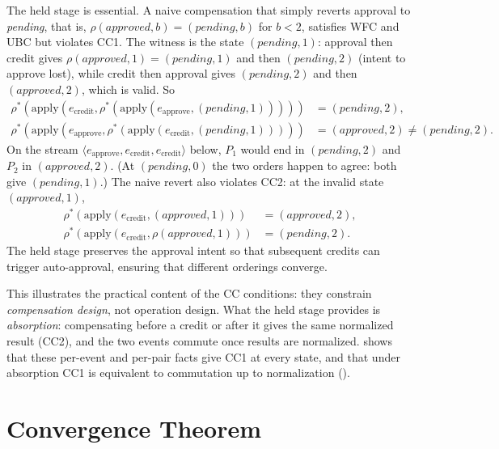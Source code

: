 \documentclass[11pt,a4paper]{article}
\theoremstyle{plain}
\theoremstyle{definition}
\theoremstyle{remark}
\renewcommand{\_}{\textunderscore\allowbreak}
\begin{document}
The held stage is essential.  A naive compensation that simply reverts
approval to \textit{pending}, that is,
$\rho(\textit{approved}, b) = (\textit{pending}, b)$ for $b < 2$, satisfies WFC
and UBC but violates CC1.  The witness is the state $(\textit{pending}, 1)$:
approval then credit gives $\rho(\textit{approved}, 1) = (\textit{pending}, 1)$
and then $(\textit{pending}, 2)$ (intent to approve lost), while credit then
approval gives $(\textit{pending}, 2)$ and then $(\textit{approved}, 2)$, which
is valid.  So
\begin{align*}
\rho^*(\mathrm{apply}(e_{\mathrm{credit}},
  \rho^*(\mathrm{apply}(e_{\mathrm{approve}}, (\textit{pending}, 1)))))
&= (\textit{pending}, 2), \\
\rho^*(\mathrm{apply}(e_{\mathrm{approve}},
  \rho^*(\mathrm{apply}(e_{\mathrm{credit}}, (\textit{pending}, 1)))))
&= (\textit{approved}, 2) \neq (\textit{pending}, 2).
\end{align*}
On the stream $\langle e_{\mathrm{approve}}, e_{\mathrm{credit}},
e_{\mathrm{credit}} \rangle$ below, $P_1$ would end in $(\textit{pending}, 2)$
and $P_2$ in $(\textit{approved}, 2)$.  (At $(\textit{pending}, 0)$ the two
orders happen to agree: both give $(\textit{pending}, 1)$.)  The naive revert
also violates CC2: at the invalid state $(\textit{approved}, 1)$,
\begin{align*}
\rho^*(\mathrm{apply}(e_{\mathrm{credit}}, (\textit{approved}, 1)))
&= (\textit{approved}, 2), \\
\rho^*(\mathrm{apply}(e_{\mathrm{credit}}, \rho(\textit{approved}, 1)))
&= (\textit{pending}, 2).
\end{align*}
The held stage preserves the approval intent so that
subsequent credits can trigger auto-approval, ensuring that different orderings
converge.

This illustrates the practical content of the CC conditions: they constrain
\emph{compensation design}, not operation design.  What the held stage provides
is \emph{absorption}: compensating before a credit or after it gives the same
normalized result (CC2), and the two events commute once results are
normalized.   shows that these per-event and per-pair facts
give CC1 at every state, and that under absorption CC1 is equivalent to
commutation up to normalization ().

\section{Convergence Theorem}
\label{sec:convergence}
\end{document}
